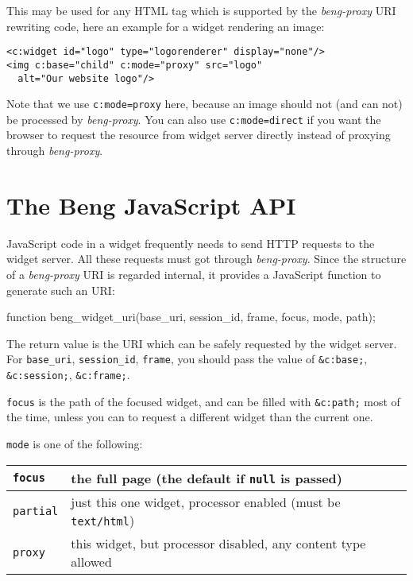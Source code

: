 \documentclass[a4paper,12pt]{article}
\begin{document}
This may be used for any HTML tag which is supported by the
\emph{beng-proxy} URI rewriting code, here an example for a widget
rendering an image:

\begin{verbatim}
<c:widget id="logo" type="logorenderer" display="none"/>
<img c:base="child" c:mode="proxy" src="logo"
  alt="Our website logo"/>
\end{verbatim}

Note that we use \texttt{c:mode=proxy} here, because an image should
not (and can not) be processed by \emph{beng-proxy}.  You can also use
\texttt{c:mode=direct} if you want the browser to request the resource
from widget server directly instead of proxying through
\emph{beng-proxy}.


\section{The Beng JavaScript API}

JavaScript code in a widget frequently needs to send HTTP requests to
the widget server.  All these requests must got through
\emph{beng-proxy}.  Since the structure of a \emph{beng-proxy} URI is
regarded internal, it provides a JavaScript function to generate such
an URI:

\begin{verbatim*}
function beng_widget_uri(base_uri, session_id, frame, focus, mode, path);
\end{verbatim*}

The return value is the URI which can be safely requested by the
widget server.  For \texttt{base\_uri}, \texttt{session\_id},
\texttt{frame}, you should pass the value of \texttt{\&c:base;},
\texttt{\&c:session;}, \texttt{\&c:frame;}.

\texttt{focus} is the path of the focused widget, and can be filled
with \texttt{\&c:path;} most of the time, unless you can to request a
different widget than the current one.

\texttt{mode} is one of the following:

\begin{tabular}{|l|p{12cm}|}
\hline

\texttt{focus} & the full page (the default if \texttt{null} is
passed) \\

\hline

\texttt{partial} & just this one widget, processor enabled (must be
\texttt{text/html}) \\

\hline
\texttt{proxy} & this widget, but processor disabled, any content type
allowed \\
\hline
\end{tabular}
\end{document}
